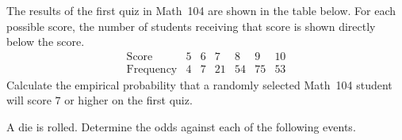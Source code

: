 \documentclass[addpoints,12pt]{exam}
\begin{document}
\begin{questions}

\question[10] The results of the first quiz in Math~104 are
shown in the table below. For each possible score, the number
of students receiving that score is shown directly below
the score.
\[\begin{array}{c|ccccccc}
\text{Score}&5&6&7&8&9&10\\\hline
\text{Frequency}&4&7&21&54&75&53
\end{array}\]
Calculate the empirical probability that a randomly
selected Math~104 student will score $7$ or higher
on the first quiz.

\question[12] A die is rolled. Determine the odds
against each of the following events.

\end{questions}
\end{document}
